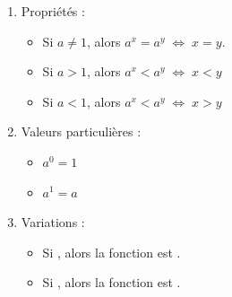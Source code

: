 \documentclass[12pt,a4paper]{article}
\begin{document}
\begin{myprops}
	\begin{enumerate}
		
		\item Propriétés :
			\begin{itemize}
				\item Si $a \neq 1$, alors $a^x = a^y \; \Leftrightarrow \; x = y$.
				\item Si $a > 1$, alors $a^x < a^y \; \Leftrightarrow \; x < y$
				\item Si $a < 1$, alors $a^x < a^y \; \Leftrightarrow \; x > y$
			\end{itemize}
		
		\item Valeurs particulières :
		\begin{itemize}
			\item $a^0 = 1$
			\item $a^1 = a$
		\end{itemize}
		
		
		\item Variations :
			\begin{itemize}
				\item Si , alors la fonction est .
				\item Si , alors la fonction est .
			\end{itemize}
	\end{enumerate}
\end{myprops}
\end{document}
